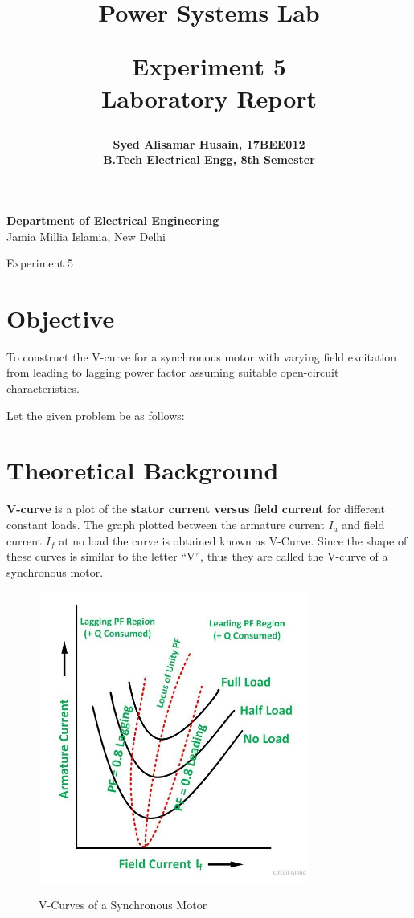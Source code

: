 \documentclass[a4paper,12pt]{article}
\title{
  {\Huge \bf Power Systems Lab}\\
  \vspace{0.25in}

  {\bf Experiment 5}\\
  Laboratory Report
  \vspace{1in}
}
\author{
  \bf Syed Alisamar Husain, 17BEE012\\
  B.Tech Electrical Engg, 8th Semester
}
\begin{document}
  \begin{titlepage}
    \maketitle
    \vspace*{\fill}
    \begin{center}
      {\bfseries Department of Electrical Engineering} \\
      Jamia Millia Islamia, New Delhi
    \end{center}
    \thispagestyle{empty}
  \end{titlepage}
  
  \newpage
  \begin{center}
    \huge Experiment 5
    \vspace{0.5in}
  \end{center}

  \section{Objective}
  To construct the V-curve for a synchronous motor with varying field excitation 
  from leading to lagging power factor assuming suitable open-circuit characteristics.

  Let the given problem be as follows:

  \section{Theoretical Background}
  {\bf V-curve} is a plot of the {\bf stator current versus field current} for different 
  constant loads. The graph plotted between the armature current $I_a$ and field 
  current $I_f$ at no load the curve is obtained known as V-Curve. Since the 
  shape of these curves is similar to the letter “V”, thus they are called the 
  V-curve of a synchronous motor.
  
    \begin{figure}[H]
      \centering
      \includegraphics[width=3.5in]{img/vcurves.jpg}
      \label{vcurves}
      \caption{V-Curves of a Synchronous Motor}
    \end{figure}
\end{document}
